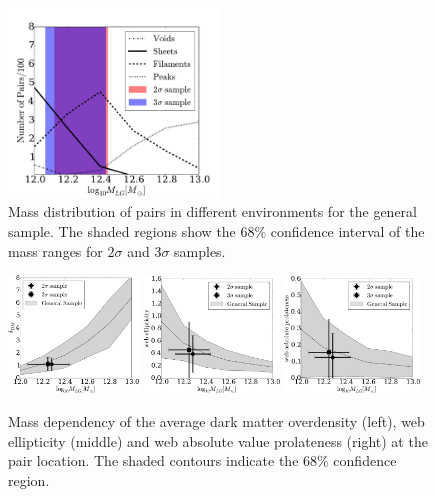 \documentclass{emulateapj}
\begin{document}
\begin{figure}
\begin{center}
  \includegraphics[width=0.50\textwidth]{fig1.pdf}
\caption{Mass distribution of pairs in different environments
for the general sample.
The shaded regions show the $68\%$ confidence interval of the mass ranges for $2\sigma$ and $3\sigma$
samples.  
\label{fig:median_fraction}}
\end{center}
\end{figure}


\begin{figure}
\begin{center}
  \includegraphics[width=0.31\textwidth]{fig2a.pdf}
  \includegraphics[width=0.32\textwidth]{fig2b.pdf}
  \includegraphics[width=0.32\textwidth]{fig2c.pdf}
\caption{Mass dependency of the average dark matter overdensity (left),
  web ellipticity (middle) and web absolute value prolateness (right) at the
  pair location. The shaded contours indicate the $68\%$ confidence region. 
\label{fig:median_overdensity}}
\end{center}
\end{figure}
\end{document}
